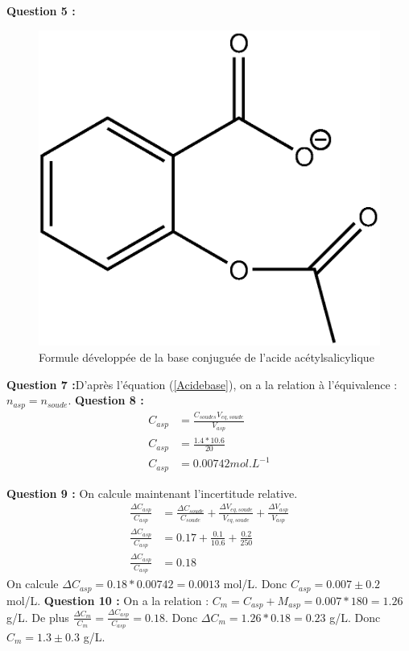 \documentclass[12pt]{article}
\begin{document}
\textbf{Question 5 :}	
\begin{figure}[h!]
	\begin{center}
		\includegraphics[scale=0.3]{base_aspirine.eps}
		\caption{Formule développée de la base conjuguée de l'acide acétylsalicylique}	
		\label{base}
	\end{center}
\end{figure}	

\textbf{Question 7 :}D'après l'équation (\ref{Acidebase}), on a la relation à l'équivalence : $n_{asp}=n_{soude}$. \textbf{Question 8 :} 
\begin{align*}
C_{asp}&=\frac{C_{soudes}V_{eq,soude}}{V_{asp}} \\
C_{asp}&=\frac{1.4*10.6}{20} \\
C_{asp}&=0.00742 mol.L^{-1}
\end{align*}

\textbf{Question 9 :} On calcule maintenant l'incertitude relative. 
\begin{align*}
\frac{\Delta C_{asp}}{C_{asp}}&=\frac{\Delta C_{soude}}{C_{soude}}+\frac{\Delta V_{eq,soude}}{V_{eq,soude}} + \frac{\Delta V_{asp}}{V_{asp}}\\
\frac{\Delta C_{asp}}{C_{asp}}&= 0.17 + \frac{0.1}{10.6} +\frac{0.2}{250} \\
\frac{\Delta C_{asp}}{C_{asp}}&= 0.18 
\end{align*}
On calcule $\Delta C_{asp}=0.18 * 0.00742 = 0.0013$ mol/L. Donc $C_{asp}=0.007 \pm 0.2$ mol/L. 
\textbf{Question 10 :} On a la relation : $C_m=C_{asp}+M_{asp}=0.007*180=1.26$ g/L. De plus $\frac{\Delta C_m}{C_m}=\frac{\Delta C_{asp}}{C_{asp}}=0.18$. Donc $\Delta C_m=1.26*0.18=0.23$ g/L. Donc $C_m=1.3\pm 0.3$ g/L. 
\end{document}
